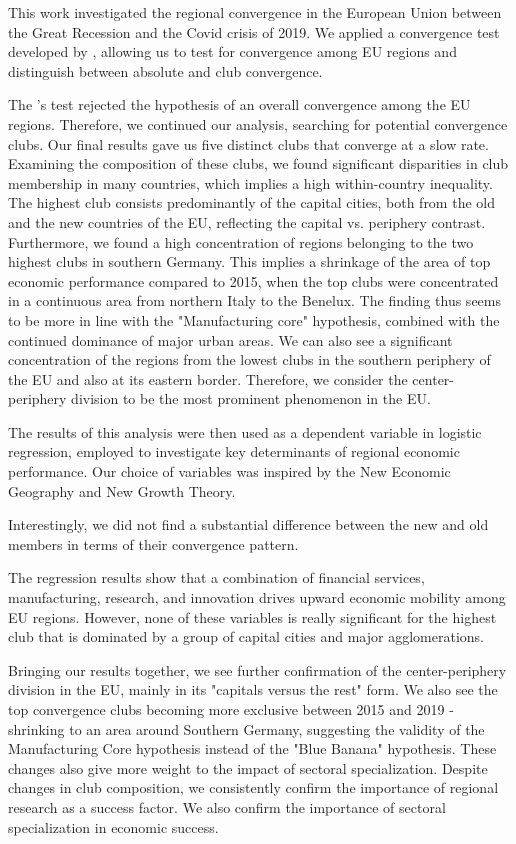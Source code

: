 \documentclass[11pt]{article}
\begin{document}
This work investigated the regional convergence in the European Union between the Great Recession and the Covid crisis of 2019. We applied a convergence test developed by \citet{phillips2009economic}, allowing us to test for convergence among EU regions and distinguish between absolute and club convergence.

The \citeauthor{phillips2009economic}'s test rejected the hypothesis of an overall convergence among the EU regions. Therefore, we continued our analysis, searching for potential convergence clubs. Our final results gave us five distinct clubs 
that converge at a slow rate. Examining the composition of these clubs, we found significant disparities in club membership in many countries, which implies a high within-country inequality. The highest club consists predominantly of the capital cities, both from the old and the new countries of the EU, reflecting the capital vs. periphery contrast. Furthermore, we found a high concentration of regions belonging to the two highest clubs in southern Germany. This implies a shrinkage of the area of top economic performance compared to 2015, when the top clubs were concentrated in a continuous area from northern Italy to the Benelux. The finding thus seems to be more in line with the "Manufacturing core" hypothesis, combined with the continued dominance of major urban areas. We can also see a significant concentration of the regions from the lowest clubs in the southern periphery of the EU and also at its eastern border. Therefore, we consider the center-periphery division to be the most prominent phenomenon in the EU.

The results of this analysis were then used as a dependent variable in logistic regression, employed to investigate key determinants of regional economic performance. Our choice of variables was inspired by the New Economic Geography and New Growth Theory.


Interestingly, we did not find a substantial difference between the new and old members in terms of their convergence pattern.


The regression results show that a combination of financial services, manufacturing, research, and innovation drives upward economic mobility among EU regions. However, none of these variables is really significant for the highest club that is dominated by a group of capital cities and major agglomerations.
 
 
Bringing our results together, we see further confirmation of the center-periphery division in the EU, mainly in its "capitals versus the rest" form. We also see the top convergence clubs becoming more exclusive between 2015 and 2019 - shrinking to an area around Southern Germany, suggesting the validity of the Manufacturing Core hypothesis instead of the "Blue Banana" hypothesis. These changes also give more weight to the impact of sectoral specialization. Despite changes in club composition, we consistently confirm the importance of regional research as a success factor. We also confirm the importance of sectoral specialization in economic success. 
\end{document}
